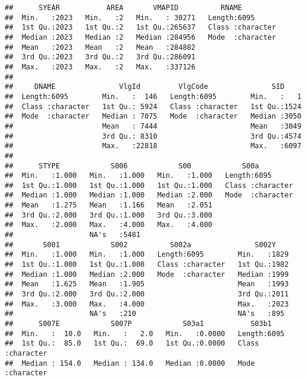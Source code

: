 \documentclass[
]{article}
\begin{document}
\begin{verbatim}
##      SYEAR           AREA       VMAPID          RNAME          
##  Min.   :2023   Min.   :2   Min.   : 30271   Length:6095       
##  1st Qu.:2023   1st Qu.:2   1st Qu.:265637   Class :character  
##  Median :2023   Median :2   Median :284956   Mode  :character  
##  Mean   :2023   Mean   :2   Mean   :284882                     
##  3rd Qu.:2023   3rd Qu.:2   3rd Qu.:286091                     
##  Max.   :2023   Max.   :2   Max.   :337126                     
##                                                                
##     DNAME               VlgId         VlgCode               SID      
##  Length:6095        Min.   :  146   Length:6095        Min.   :   1  
##  Class :character   1st Qu.: 5924   Class :character   1st Qu.:1524  
##  Mode  :character   Median : 7075   Mode  :character   Median :3050  
##                     Mean   : 7444                      Mean   :3049  
##                     3rd Qu.: 8310                      3rd Qu.:4574  
##                     Max.   :22818                      Max.   :6097  
##                                                                      
##      STYPE            S006            S00            S00a          
##  Min.   :1.000   Min.   :1.000   Min.   :1.000   Length:6095       
##  1st Qu.:1.000   1st Qu.:1.000   1st Qu.:1.000   Class :character  
##  Median :1.000   Median :1.000   Median :2.000   Mode  :character  
##  Mean   :1.275   Mean   :1.166   Mean   :2.051                     
##  3rd Qu.:2.000   3rd Qu.:1.000   3rd Qu.:3.000                     
##  Max.   :2.000   Max.   :4.000   Max.   :4.000                     
##                  NA's   :5481                                      
##       S001            S002          S002a               S002Y     
##  Min.   :1.000   Min.   :1.000   Length:6095        Min.   :1829  
##  1st Qu.:1.000   1st Qu.:1.000   Class :character   1st Qu.:1982  
##  Median :1.000   Median :2.000   Mode  :character   Median :1999  
##  Mean   :1.625   Mean   :1.905                      Mean   :1993  
##  3rd Qu.:2.000   3rd Qu.:2.000                      3rd Qu.:2011  
##  Max.   :3.000   Max.   :4.000                      Max.   :2023  
##                  NA's   :210                        NA's   :895   
##      S007E            S007P            S03a1           S03b1          
##  Min.   :  10.0   Min.   :   2.0   Min.   :0.0000   Length:6095       
##  1st Qu.:  85.0   1st Qu.:  69.0   1st Qu.:0.0000   Class :character  
##  Median : 154.0   Median : 134.0   Median :0.0000   Mode  :character  

\end{verbatim}
\end{document}
